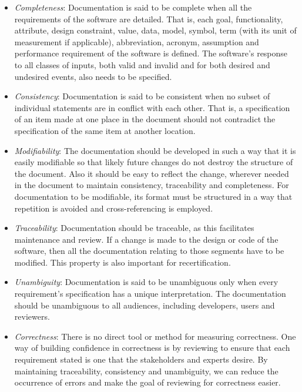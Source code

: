 \documentclass[12pt]{article}
\begin{document}
\begin{itemize}

\item \emph{Completeness}: Documentation is said to be complete when all the
  requirements of the software are detailed. That is, each goal, functionality,
  attribute, design constraint, value, data, model, symbol, term (with its unit
  of measurement if applicable), abbreviation, acronym, assumption and
  performance requirement of the software is defined.  The software's response
  to all classes of inputs, both valid and invalid and for both desired and
  undesired events, also needs to be specified.

\item \emph{Consistency}: Documentation is said to be consistent when no subset
  of individual statements are in conflict with each other. That is, a
  specification of an item made at one place in the document should not
  contradict the specification of the same item at another location.

\item \emph{Modifiability}: The documentation should be developed in such a way
  that it is easily modifiable so that likely future changes do not destroy the
  structure of the document. Also it should be easy to reflect the change,
  wherever needed in the document to maintain consistency, traceability and
  completeness. For documentation to be modifiable, its format must be
  structured in a way that repetition is avoided and cross-referencing is
  employed.

\item \emph{Traceability}: Documentation should be traceable, as this
  facilitates maintenance and review. If a change is made to the design or code
  of the software, then all the documentation relating to those segments have to
  be modified.  This property is also important for recertification.

\item \emph{Unambiguity}: Documentation is said to be unambiguous only when
  every requirement's specification has a unique interpretation.  The
  documentation should be unambiguous to all audiences, including developers,
  users and reviewers.

\item \emph{Correctness}: There is no direct tool or method for measuring
  correctness. One way of building confidence in correctness is by reviewing to
  ensure that each requirement stated is one that the stakeholders and experts
  desire.  By maintaining traceability, consistency and unambiguity, we can
  reduce the occurrence of errors and make the goal of reviewing for correctness
  easier.


\end{itemize}
\end{document}
